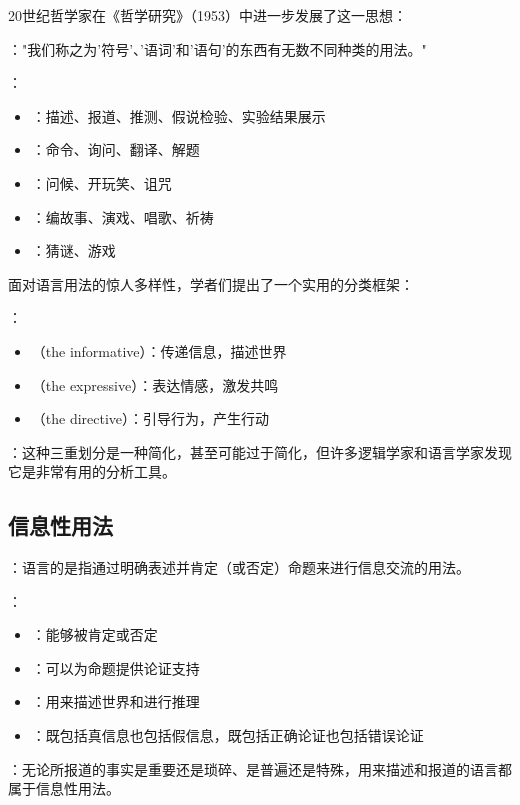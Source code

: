 \begin{theorembox}[title=维特根斯坦的语言游戏理论]
20世纪哲学家在《哲学研究》（1953）中进一步发展了这一思想：

："我们称之为'符号'、'语词'和'语句'的东西有无数不同种类的用法。"

：
\begin{itemize}
  \item {}：描述、报道、推测、假说检验、实验结果展示
  \item {}：命令、询问、翻译、解题
  \item {}：问候、开玩笑、诅咒
  \item {}：编故事、演戏、唱歌、祈祷
  \item {}：猜谜、游戏
\end{itemize}
\end{theorembox}

\begin{theorembox}[title=语言功能的三重划分]
面对语言用法的惊人多样性，学者们提出了一个实用的分类框架：

：
\begin{itemize}
  \item {}（the informative）：传递信息，描述世界
  \item {}（the expressive）：表达情感，激发共鸣
  \item {}（the directive）：引导行为，产生行动
\end{itemize}

：这种三重划分是一种简化，甚至可能过于简化，但许多逻辑学家和语言学家发现它是非常有用的分析工具。
\end{theorembox}

\subsection{信息性用法}

\begin{theorembox}[title=信息性功能的定义与特征]
：语言的是指通过明确表述并肯定（或否定）命题来进行信息交流的用法。

：
\begin{itemize}
  \item {}：能够被肯定或否定
  \item {}：可以为命题提供论证支持
  \item {}：用来描述世界和进行推理
  \item {}：既包括真信息也包括假信息，既包括正确论证也包括错误论证
\end{itemize}

：无论所报道的事实是重要还是琐碎、是普遍还是特殊，用来描述和报道的语言都属于信息性用法。
\end{theorembox}

